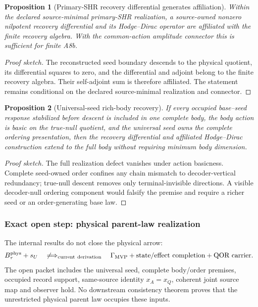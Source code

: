 \documentclass[11pt]{article}
\newtheorem{proposition}{Proposition}
\newcommand{\GMVP}{\Gamma_{\mathrm{MVP}}}
\begin{document}
\begin{proposition}[Primary-SHR recovery differential generates affiliation]
\label{prop:shr-recovery-differential-a8b}
Within the declared source-minimal primary-SHR realization, a source-owned
nonzero nilpotent recovery differential and its Hodge--Dirac operator are
affiliated with the finite recovery algebra.  With the common-action amplitude
connector this is sufficient for finite A8b.
\end{proposition}
\begin{proof}[Proof sketch]
The reconstructed seed boundary descends to the physical quotient, its
differential squares to zero, and the differential and adjoint belong to the
finite recovery algebra.  Their self-adjoint sum is therefore affiliated.
The statement remains conditional on the declared source-minimal realization
and connector.
\end{proof}

\begin{proposition}[Universal-seed rich-body recovery]
\label{prop:universal-seed-rich-body-recovery}
If every occupied base--seed response stabilized before descent is included in
one complete body, the body action is basic on the true-null quotient, and the
universal seed owns the complete ordering presentation, then the recovery
differential and affiliated Hodge--Dirac construction extend to the full body
without requiring minimum body dimension.
\end{proposition}
\begin{proof}[Proof sketch]
The full realization defect vanishes under action basicness.  Complete
seed-owned order confines any chain mismatch to decoder-vertical redundancy;
true-null descent removes only terminal-invisible directions.  A visible
decoder-null ordering component would falsify the premise and require a richer
seed or an order-generating base law.
\end{proof}

\subsubsection{Exact open step: physical parent-law realization}

The internal results do not close the physical arrow:
\begin{equation}
 B_\tau^{\rm phys}+s_U
 \quad\not\Longrightarrow_{\rm current\ derivation}\quad
 \GMVP+\text{state/effect completion}+\text{QOR carrier}.
 \label{eq:mvp-nonselection}
\end{equation}
The open packet includes the universal seed, complete body/order premises,
occupied record support, same-source identity \(x_A=x_Q\), coherent joint
source map and observer hold.  No downstream consistency theorem proves that
the unrestricted physical parent law occupies these inputs.
\end{document}
